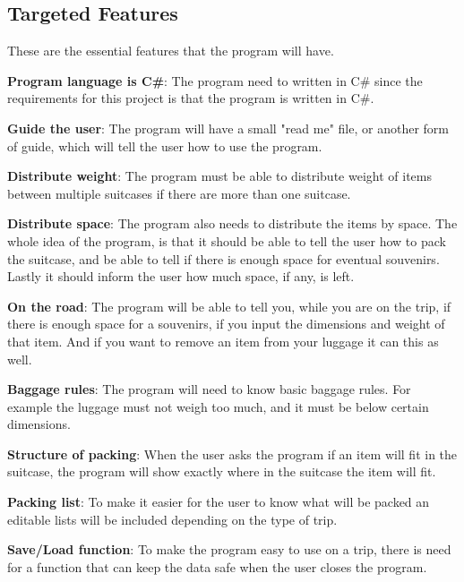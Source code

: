 \subsection{Targeted Features}
These are the essential features that the program will have.\newline

\textbf{Program language is C\#}:
The program need to written in C\# since the requirements for this project is that the program is written in C\#.

\textbf{Guide the user}:
The program will have a small "read me" file, or another form of guide, which will tell the user how to use the program.
\newline

\textbf{Distribute weight}:
The program must be able to distribute weight of items between multiple suitcases if there are more than one suitcase.
\newline

\textbf{Distribute space}:
The program also needs to distribute the items by space. The whole idea of the program, is that it should be able to tell the user how to pack the suitcase, and be able to tell if there is enough space for eventual souvenirs. Lastly it should inform the user how much space, if any, is left.
\newline

\textbf{On the road}:
The program will be able to tell you, while you are on the trip, if there is enough space for a souvenirs, if you input the dimensions and weight of that item. And if you want to remove an item from your luggage it can this as well.
\newline

\textbf{Baggage rules}:
The program will need to know basic baggage rules. For example the luggage must not weigh too much, and it must be below certain dimensions.
\newline

\textbf{Structure of packing}:
When the user asks the program if an item will fit in the suitcase, the program will show exactly where in the suitcase the item will fit.
\newline

\textbf{Packing list}:
To make it easier for the user to know what will be packed an editable lists will be included depending on the type of trip.
\newline

\textbf{Save/Load function}:
To make the program easy to use on a trip, there is need for a function that can keep the data safe when the user closes the program.
\newline

